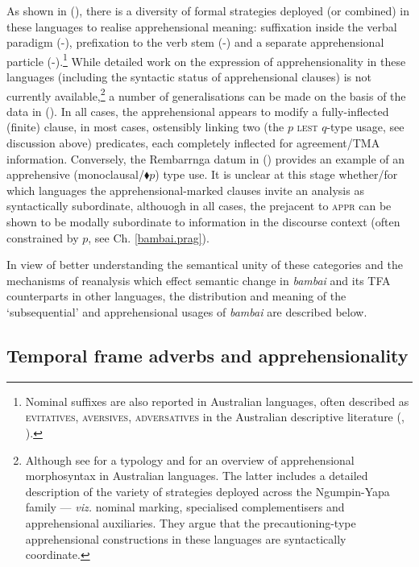 As shown in (\lastx), there is a diversity of formal strategies deployed (or combined) in these languages to realise apprehensional meaning: suffixation inside the verbal paradigm (-), prefixation to the verb stem (-) and a separate apprehensional particle (-).\footnote{Nominal suffixes are also reported in Australian languages, often described as \textsc{evitatives}, \textsc{aversives, adversatives} in the Australian descriptive literature (\citealp[9]{Zester2010}, \citealp[][]{Browne}).} While detailed work on the expression of apprehensionality in these languages (including the syntactic status of apprehensional clauses) is not currently available,\footnote{Although see \citet{Zester2010} for a typology and \citet{Browne} for an overview of apprehensional morphosyntax in Australian languages. The latter includes a detailed description of the variety of strategies deployed across the Ngumpin-Yapa family --- \textit{viz.} nominal marking, specialised complementisers and apprehensional auxiliaries. They argue that the precautioning-type apprehensional constructions in these languages are syntactically coordinate.} a number of generalisations can be made on the basis of the data in (\lastx). In all cases, the apprehensional appears to modify a fully-inflected (finite) clause, in most cases, ostensibly linking two (the $ p $ \textsc{lest} $ q $-type usage, see discussion above) predicates, each completely inflected for agreement/TMA information. Conversely, the Rembarrnga datum in () provides an example of an apprehensive (monoclausal/$ \blacklozenge p $) type use. It is unclear at this stage whether/for which languages the apprehensional-marked clauses invite an analysis as syntactically subordinate, althouogh in all cases, the prejacent to \textsc{appr} can be shown to be modally subordinate to information in the discourse context (often constrained by $ p $, see Ch. \ref{bambai.prag}). 

 In view of better understanding the semantical unity of these categories and the mechanisms of reanalysis which effect semantic change in \textit{bambai} and its TFA counterparts in other languages, the distribution and meaning of the `subsequential' and apprehensional usages of \textit{bambai} are described below.
 
\subsection{Temporal frame adverbs and apprehensionality}\label{dataS}

